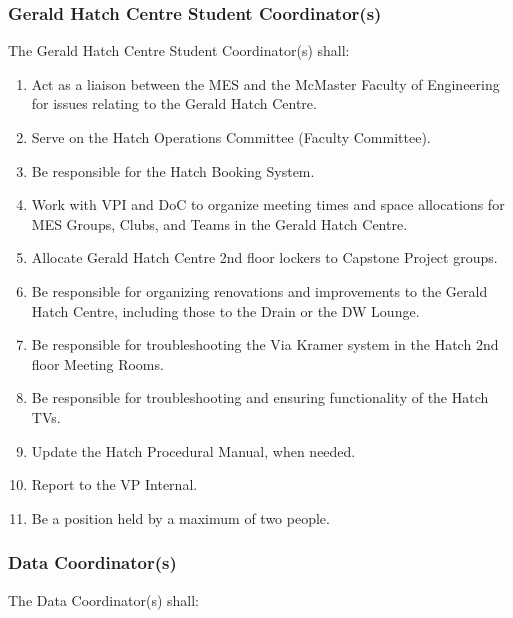 \subsubsection{Gerald Hatch Centre Student Coordinator(s)}
\label{gerald-hatch-centre-student-coordinators}
The Gerald Hatch Centre Student Coordinator(s) shall:

\begin{enumerate}
 \item
  Act as a liaison between the MES and the McMaster Faculty of Engineering for issues relating to the Gerald Hatch Centre.
 \item
  Serve on the Hatch Operations Committee (Faculty Committee).
 \item
  Be responsible for the Hatch Booking System.
 \item
  Work with VPI and DoC to organize meeting times and space allocations for MES Groups, Clubs, and Teams in the Gerald Hatch Centre.
 \item
  Allocate Gerald Hatch Centre 2nd floor lockers to Capstone Project groups.
 \item
  Be responsible for organizing renovations and improvements to the Gerald Hatch Centre, including those to the Drain or the DW Lounge.
 \item
  Be responsible for troubleshooting the Via Kramer system in the Hatch 2nd floor Meeting Rooms.
 \item
  Be responsible for troubleshooting and ensuring functionality of the Hatch TVs.
 \item
  Update the Hatch Procedural Manual, when needed.
 \item
  Report to the VP Internal.
 \item
  Be a position held by a maximum of two people.

\end{enumerate}

\subsubsection{Data Coordinator(s)}
\label{data-coordinators}
The Data Coordinator(s) shall:

